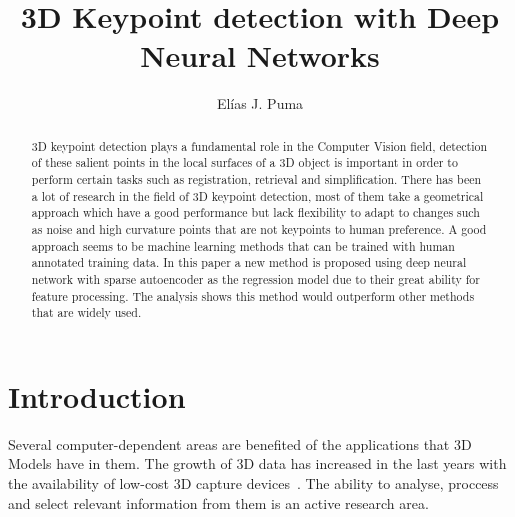 \documentclass{comjnl}
\begin{document}
\title[Modelling Bidders in Sequential Automated Auctions]{3D Keypoint detection with Deep Neural Networks}
\author{El\'{i}as J. Puma}






\begin{abstract}
3D keypoint detection plays a fundamental role in the Computer Vision field, detection of these salient points in the local surfaces of a 3D object is important in order to perform certain tasks such as registration, retrieval and simplification. There has been a lot of research in the field of 3D keypoint detection, most of them take a geometrical approach which have a good performance but lack flexibility to adapt to changes such as noise and high curvature points that are not keypoints to human preference. A good approach seems to be machine learning methods that can be trained with human annotated training data. In this paper a new method is proposed using deep neural network with sparse autoencoder as the regression model due to their great ability for feature processing. The analysis shows this method would outperform other methods that are widely used.  
\end{abstract}

\maketitle


\section{Introduction}
Several computer-dependent areas are benefited of the applications
that 3D Models have in them. The growth of 3D data has increased in
the last years with the availability of low-cost 3D capture devices~\cite{harris3D}.
The ability to analyse, proccess and select relevant information
from them is an active research area. 
\end{document}
